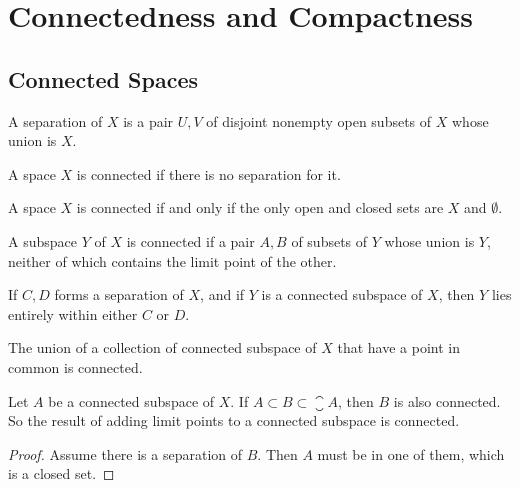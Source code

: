 \chapter{Connectedness and Compactness}

\section{Connected Spaces}

\begin{definition}
    A separation of $X$ is a pair $U,V$ of disjoint nonempty open subsets of $X$ whose union is $X$.
\end{definition}

\begin{definition}
    A space $X$ is connected if there is no separation for it.
\end{definition}

\begin{theorem}
    A space $X$ is connected if and only if the only open and closed sets are $X$ and $\emptyset$.
\end{theorem}

\begin{theorem}
    A subspace $Y$ of $X$ is connected if a pair $A,B$ of subsets of $Y$ whose union is $Y$, neither of which contains the limit point of the other.    
\end{theorem}

\begin{theorem}
    If $C,D$ forms a separation of $X$, and if $Y$ is a connected subspace of $X$, then $Y$ lies entirely within either $C$ or $D$.
\end{theorem}

\begin{theorem}
The union of a collection of connected subspace of $X$ that have a point in common is connected.    
\end{theorem}

\begin{theorem}
Let $A$ be a connected subspace of $X$. If $A \subset B \subset \closure{A}$, then $B$ is also connected. So the result of adding limit points to a connected subspace is connected.
\end{theorem}
\begin{proof}
    Assume there is a separation of $B$. Then $A$ must be in one of them, which is a closed set.
\end{proof}

